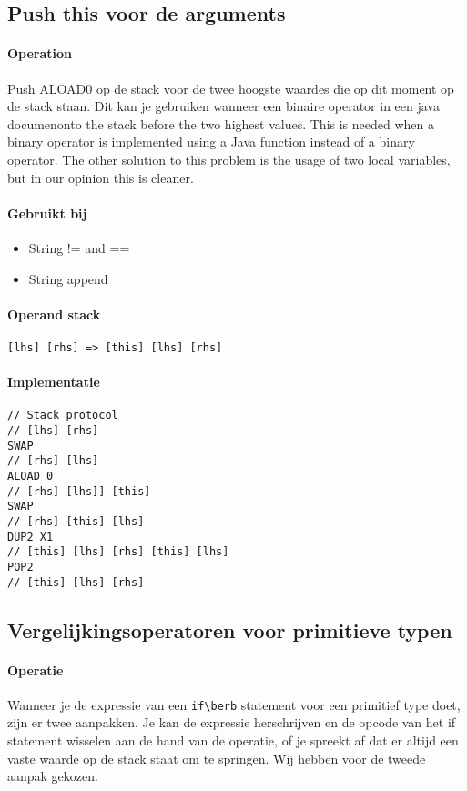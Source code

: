 \subsection{Push this voor de arguments}
\paragraph{Operation}
Push ALOAD0 op de stack voor de twee hoogste waardes die op dit moment op de stack staan. Dit kan je gebruiken wanneer een binaire operator in een java documenonto the stack before the two highest values. This is needed when a binary operator is implemented using a Java function instead of a binary operator. The other solution to this problem is the usage of two local variables, but in our opinion this is cleaner.

\paragraph{Gebruikt bij}
\begin{itemize}
	\item{String != and ==}
	\item{String append}
\end{itemize}

\paragraph{Operand stack}
\verb+[lhs] [rhs] => [this] [lhs] [rhs]+

\paragraph{Implementatie}
\begin{verbatim}
// Stack protocol
// [lhs] [rhs]
SWAP
// [rhs] [lhs]
ALOAD 0
// [rhs] [lhs]] [this]
SWAP
// [rhs] [this] [lhs]
DUP2_X1
// [this] [lhs] [rhs] [this] [lhs]
POP2
// [this] [lhs] [rhs]
\end{verbatim}

\subsection{Vergelijkingsoperatoren voor primitieve typen}
\paragraph{Operatie}
Wanneer je de expressie van een \verb+if\berb+ statement voor een primitief type doet, zijn er twee aanpakken. Je kan de expressie herschrijven en de opcode van het if statement wisselen aan de hand van de operatie, of je spreekt af dat er altijd een vaste waarde op de stack staat om te springen.
Wij hebben voor de tweede aanpak gekozen.

